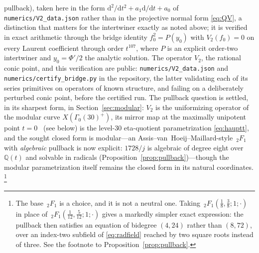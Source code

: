\documentclass[cntp]{ipart}
\newcommand{\rmd}{\mathrm{d}}
\theoremstyle{plain}
\theoremstyle{remark}
\begin{document}
pullback), taken here in the form $\rmd^2/\rmd t^2+a_1\rmd/\rmd t+a_0$ of \texttt{numerics/V2\_data.json}
rather than in the projective normal form \eqref{eq:QV}, a distinction that matters for the intertwiner
exactly as noted above; it is verified in exact arithmetic through the bridge identity $f_0^2=P(y_0)$ with $V_2(f_0)=0$ on every
Laurent coefficient through order $t^{107}$, where $P$ is an explicit order-two intertwiner and $y_0=\Phi'/2$ the
analytic solution. The operator $V_2$, the rational conic point, and this verification are public:
\texttt{numerics/V2\_data.json} and \texttt{numerics/certify\_bridge.py} in the repository, the latter validating
each of its series primitives on operators of known structure, and failing on a deliberately perturbed conic
point, before the certified run.
The pullback question is settled, in its sharpest form, in Section~\ref{sec:modular}: $V_2$ is the uniformizing
operator of the modular curve $X(\Gamma_0(30)^+)$, its mirror map at the maximally unipotent point
$t=0$~\cite{Morrison1993} (see below) is the level-30
eta-quotient parametrization \eqref{eq:hauptt}, and the sought closed form is modular---an
Assis--van~Hoeij--Maillard-style $\,_2F_1$ with \emph{algebraic} pullback is now explicit: $1728/j$ is
algebraic of degree eight over $\mathbb{Q}(t)$ and solvable in radicals
(Proposition~\ref{prop:pullback})---though the modular parametrization itself remains the closed form in its natural
coordinates.%
\footnote{The base $\,_2F_1$ is a choice, and it is not a neutral one. Taking
$\,_2F_1\!\left(\tfrac18,\tfrac38;1;\cdot\right)$ in place of
$\,_2F_1\!\left(\tfrac1{12},\tfrac5{12};1;\cdot\right)$ gives a markedly simpler exact expression: the
pullback then satisfies an equation of bidegree $(4,24)$ rather than $(8,72)$, over an index-two subfield
of \eqref{eq:radfield} reached by two square roots instead of three. See the footnote to
Proposition~\ref{prop:pullback}.}
\end{document}
